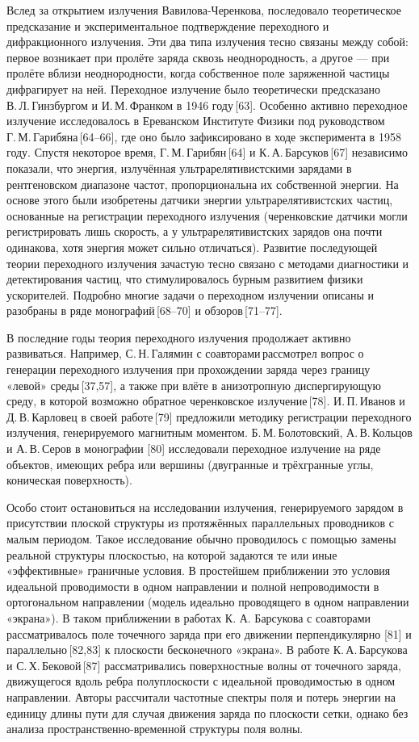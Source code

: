 Вслед за открытием излучения Вавилова-Черенкова, последовало теоретическое предсказание и экспериментальное подтверждение переходного и дифракционного излучения. Эти два типа излучения тесно связаны между собой: первое возникает при пролёте заряда сквозь неоднородность, а другое — при пролёте вблизи неоднородности, когда собственное поле заряженной частицы дифрагирует на ней. Переходное излучение было теоретически предсказано В. Л. Гинзбургом и И. М. Франком в 1946 году [63]. Особенно активно переходное излучение исследовалось в Ереванском Институте Физики под руководством Г. М. Гарибяна [64–66], где оно было зафиксировано в ходе эксперимента в 1958 году. Спустя некоторое время, Г. М. Гарибян [64] и К. А. Барсуков [67] независимо показали, что энергия, излучённая ультрарелятивистскими зарядами в рентгеновском диапазоне частот, пропорциональна их собственной энергии. На основе этого были изобретены датчики энергии ультрарелятивистских частиц, основанные на регистрации переходного излучения (черенковские датчики могли регистрировать лишь скорость, а у ультрарелятивистских зарядов она почти одинакова, хотя энергия может сильно отличаться). Развитие последующей теории переходного излучения зачастую тесно связано с методами диагностики и детектирования частиц, что стимулировалось бурным развитием физики ускорителей. Подробно многие задачи о переходном излучении описаны и разобраны в ряде монографий [68–70] и обзоров [71–77].  

В последние годы теория переходного излучения продолжает активно развиваться. Например, С. Н. Галямин с соавторами рассмотрел вопрос о генерации переходного излучения при прохождении заряда через границу «левой» среды [37,57], а также при влёте в анизотропную диспергирующую среду, в которой возможно обратное черенковское излучение [78]. И. П. Иванов и Д. В. Карловец в своей работе [79] предложили методику регистрации переходного излучения, генерируемого магнитным моментом. Б. М. Болотовский, А. В. Кольцов и А. В. Серов в монографии [80] исследовали переходное излучение на ряде объектов, имеющих ребра или вершины (двугранные и трёхгранные углы, коническая поверхность).  

Особо стоит остановиться на исследовании излучения, генерируемого зарядом в присутствии плоской структуры из протяжённых параллельных проводников с малым периодом. Такое исследование обычно проводилось с помощью замены реальной структуры плоскостью, на которой задаются те или иные «эффективные» граничные условия. В простейшем приближении это условия идеальной проводимости в одном направлении и полной непроводимости в ортогональном направлении (модель идеально проводящего в одном направлении «экрана»). В таком приближении в работах К. А. Барсукова с соавторами рассматривалось поле точечного заряда при его движении перпендикулярно [81] и параллельно [82,83] к плоскости бесконечного «экрана». В работе К. А. Барсукова и С. Х. Бековой [87] рассматривались поверхностные волны от точечного заряда, движущегося вдоль ребра полуплоскости с идеальной проводимостью в одном направлении. Авторы рассчитали частотные спектры поля и потерь энергии на единицу длины пути для случая движения заряда по плоскости сетки, однако без анализа пространственно-временной структуры поля волны.  

